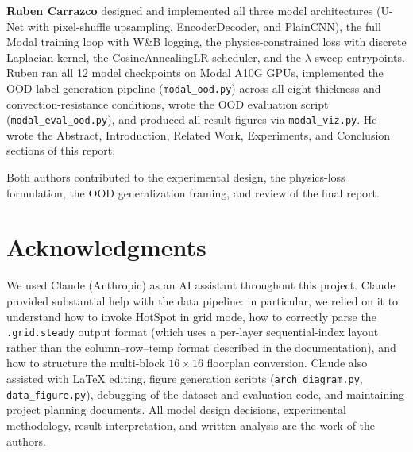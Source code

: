 \documentclass[10pt,twocolumn,letterpaper]{article}
\begin{document}
\textbf{Ruben Carrazco} designed and implemented all three model
architectures (U-Net with pixel-shuffle upsampling, EncoderDecoder,
and PlainCNN), the full Modal training loop with W\&B logging, the
physics-constrained loss with discrete Laplacian kernel, the
CosineAnnealingLR scheduler, and the $\lambda$ sweep entrypoints.
Ruben ran all 12 model checkpoints on Modal A10G GPUs, implemented
the OOD label generation pipeline (\texttt{modal\_ood.py}) across
all eight thickness and convection-resistance conditions, wrote the
OOD evaluation script (\texttt{modal\_eval\_ood.py}), and produced
all result figures via \texttt{modal\_viz.py}. He wrote the Abstract,
Introduction, Related Work, Experiments, and Conclusion sections of
this report.

Both authors contributed to the experimental design, the physics-loss
formulation, the OOD generalization framing, and review of the final
report.

\section*{Acknowledgments}

We used Claude (Anthropic) as an AI assistant throughout this project.
Claude provided substantial help with the data pipeline: in particular,
we relied on it to understand how to invoke HotSpot in grid mode, how
to correctly parse the \texttt{.grid.steady} output format (which uses
a per-layer sequential-index layout rather than the column--row--temp
format described in the documentation), and how to structure the
multi-block $16{\times}16$ floorplan conversion. Claude also assisted
with LaTeX editing, figure generation scripts (\texttt{arch\_diagram.py},
\texttt{data\_figure.py}), debugging of the dataset and evaluation
code, and maintaining project planning documents. All model design
decisions, experimental methodology, result interpretation, and written
analysis are the work of the authors.

\clearpage


\end{document}
